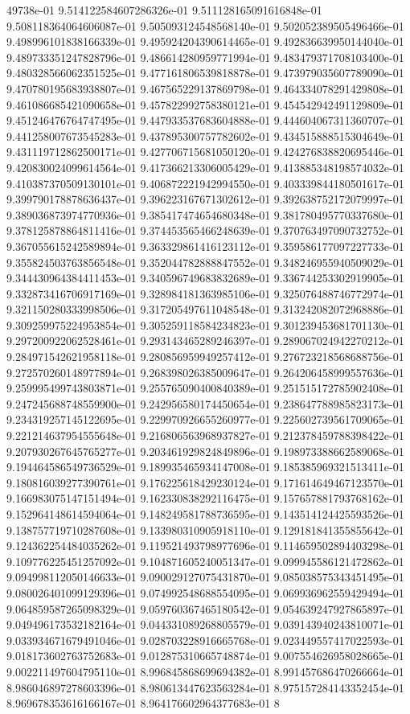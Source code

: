 49738e-01	9.514122584607286326e-01	9.511128165091616848e-01	9.508118364064606087e-01	9.505093124548568140e-01	9.502052389505496466e-01	9.498996101838166339e-01	9.495924204390614465e-01	9.492836639950144040e-01	9.489733351247828796e-01	9.486614280959771994e-01	9.483479371708103400e-01	9.480328566062351525e-01	9.477161806539818878e-01	9.473979035607789090e-01	9.470780195683938807e-01	9.467565229137869798e-01	9.464334078291429808e-01	9.461086685421090658e-01	9.457822992758380121e-01	9.454542942491129809e-01	9.451246476764747495e-01	9.447933537683604888e-01	9.444604067311360707e-01	9.441258007673545283e-01	9.437895300757782602e-01	9.434515888515304649e-01	9.431119712862500171e-01	9.427706715681050120e-01	9.424276838820695446e-01	9.420830024099614564e-01	9.417366213306005429e-01	9.413885348198574032e-01	9.410387370509130101e-01	9.406872221942994550e-01	9.403339844180501617e-01	9.399790178878636437e-01	9.396223167671302612e-01	9.392638752172079997e-01	9.389036873974770936e-01	9.385417474654680348e-01	9.381780495770337680e-01	9.378125878864811416e-01	9.374453565466248639e-01	9.370763497090732752e-01	9.367055615242589894e-01	9.363329861416123112e-01	9.359586177097227733e-01	9.355824503763856548e-01	9.352044782888847552e-01	9.348246955940509029e-01	9.344430964384411453e-01	9.340596749683832689e-01	9.336744253302919905e-01	9.332873416706917169e-01	9.328984181363985106e-01	9.325076488746772974e-01	9.321150280333998506e-01	9.317205497611048548e-01	9.313242082072968886e-01	9.309259975224953854e-01	9.305259118584234823e-01	9.301239453681701130e-01	9.297200922062528461e-01	9.293143465289246397e-01	9.289067024942270212e-01	9.284971542621958118e-01	9.280856959949257412e-01	9.276723218568688756e-01	9.272570260148977894e-01	9.268398026385009647e-01	9.264206458999557636e-01	9.259995499743803871e-01	9.255765090400840389e-01	9.251515172785902408e-01	9.247245688748559900e-01	9.242956580174450654e-01	9.238647788985823173e-01	9.234319257145122695e-01	9.229970926655260977e-01	9.225602739561709065e-01	9.221214637954555648e-01	9.216806563968937827e-01	9.212378459788398422e-01	9.207930267645765277e-01	9.203461929824849896e-01	9.198973388662589068e-01	9.194464586549736529e-01	9.189935465934147008e-01	9.185385969321513411e-01	9.180816039277390761e-01	9.176225618429230124e-01	9.171614649467123570e-01	9.166983075147151494e-01	9.162330838292116475e-01	9.157657881793768162e-01	9.152964148614594064e-01	9.148249581788736595e-01	9.143514124425593526e-01	9.138757719710287608e-01	9.133980310905918110e-01	9.129181841355855642e-01	9.124362254484035262e-01	9.119521493798977696e-01	9.114659502894403298e-01	9.109776225451257092e-01	9.104871605240051347e-01	9.099945586121472862e-01	9.094998112050146633e-01	9.090029127075431870e-01	9.085038575343451495e-01	9.080026401099129396e-01	9.074992548688554095e-01	9.069936962559429494e-01	9.064859587265098329e-01	9.059760367465180542e-01	9.054639247927865897e-01	9.049496173532182164e-01	9.044331089268805579e-01	9.039143940243810071e-01	9.033934671679491046e-01	9.028703228916665768e-01	9.023449557417022593e-01	9.018173602763752683e-01	9.012875310665748874e-01	9.007554626958028665e-01	9.002211497604795110e-01	8.996845868699694382e-01	8.991457686470266664e-01	8.986046897278603396e-01	8.980613447623563284e-01	8.975157284143352454e-01	8.969678353616166167e-01	8.964176602964377683e-01	8